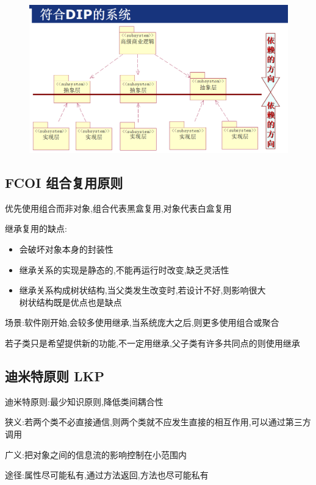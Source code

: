 \documentclass[UTF8,a4paper]{ctexart}
\begin{document}
\begin{figure}[H]
  \centering
  \includegraphics[scale = 0.3]{assets/SoftwareEngineering_dc683.png}
\end{figure}

\subsection{FCOI 组合复用原则}
优先使用组合而非对象,组合代表黑盒复用,对象代表白盒复用

继承复用的缺点:
\begin{itemize}
  \item 会破坏对象本身的封装性
  \item 继承关系的实现是静态的,不能再运行时改变,缺乏灵活性
  \item 继承关系构成树状结构,当父类发生改变时,若设计不好,则影响很大\\
  树状结构既是优点也是缺点
\end{itemize}

场景:软件刚开始,会较多使用继承,当系统庞大之后,则更多使用组合或聚合

若子类只是希望提供新的功能,不一定用继承,父子类有许多共同点的则使用继承

\subsection{迪米特原则 LKP}
迪米特原则:最少知识原则,降低类间耦合性

狭义:若两个类不必直接通信,则两个类就不应发生直接的相互作用,可以通过第三方调用

广义:把对象之间的信息流的影响控制在小范围内

途径:属性尽可能私有,通过方法返回,方法也尽可能私有
\end{document}
